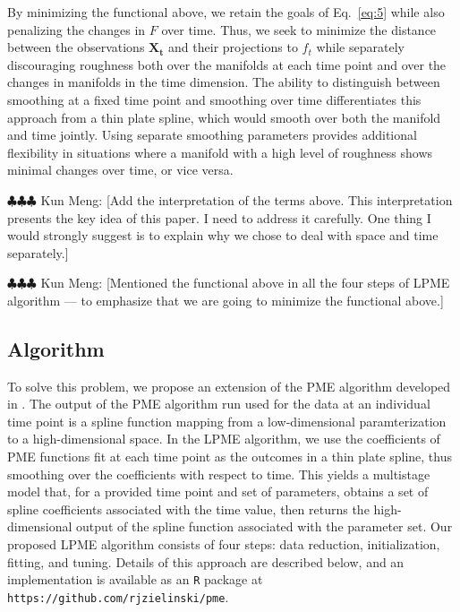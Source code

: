 \documentclass[11pt,reqno]{article}
\newcommand{\commentout}[1]{}
\newcommand{\meng}[1]{{\color{purple} \sf $\clubsuit\clubsuit\clubsuit$ Kun Meng: [#1]}}
\theoremstyle{definition}
\begin{document}
By minimizing the functional above, we retain the goals of Eq.~\eqref{eq:5} while also penalizing the changes in $F$ over time. Thus, we seek to minimize the distance between the observations $\mathbf{X_t}$ and their projections to $f_t$ while separately discouraging roughness both over the manifolds at each time point and over the changes in manifolds in the time dimension. The ability to distinguish between smoothing at a fixed time point and smoothing over time differentiates this approach from a thin plate spline, which would smooth over both the manifold and time jointly. Using separate smoothing parameters provides additional flexibility in situations where a manifold with a high level of roughness shows minimal changes over time, or vice versa.

\meng{Add the interpretation of the terms above. This interpretation presents the key idea of this paper. I need to address it carefully. One thing I would strongly suggest is to explain why we chose to deal with space and time separately.}

\meng{Mentioned the functional above in all the four steps of LPME algorithm --- to emphasize that we are going to minimize the functional above.}

\commentout{Note that we assume changes over time to be smooth. Therefore, we seek a function $f^{*}$ that minimizes $\mathcal{D}_X(f^{*})$ while penalizing both the roughness of the function over the time-independent shape and the changes in the function over time, expressed as }

\subsection{Algorithm}

To solve this problem, we propose an extension of the PME algorithm developed in \cite{mengPrincipalManifoldEstimation2021}. The output of the PME algorithm run used for the data at an individual time point is a spline function mapping from a low-dimensional paramterization to a high-dimensional space. In the LPME algorithm, we use the coefficients of PME functions fit at each time point as the outcomes in a thin plate spline, thus smoothing over the coefficients with respect to time. This yields a multistage model that, for a provided time point and set of parameters, obtains a set of spline coefficients associated with the time value, then returns the high-dimensional output of the spline function associated with the parameter set. Our proposed LPME algorithm consists of four steps: data reduction, initialization, fitting, and tuning. Details of this approach are described below, and an implementation is available as an \texttt{R} package at \texttt{https://github.com/rjzielinski/pme}.
\end{document}
